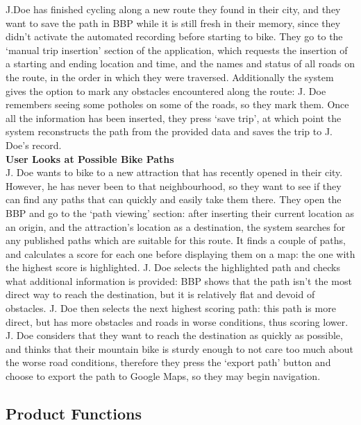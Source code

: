 J.Doe has finished cycling along a new route they found in their city, and they want to save the path 
in BBP while it is still fresh in their memory, since they didn’t activate the automated recording 
before starting to bike. They go to the ‘manual trip insertion’ section of the application, which 
requests the insertion of a starting and ending location and time, and the names and status of all 
roads on the route, in the order in which they were traversed. Additionally the system gives the 
option to mark any obstacles encountered along the route: J. Doe remembers seeing some potholes on 
some of the roads, so they mark them. Once all the information has been inserted, they press ‘save trip’, 
at which point the system reconstructs the path from the provided data and saves the trip to J. Doe’s 
record. \\
\newline
\textbf{User Looks at Possible Bike Paths}\\
J. Doe wants to bike to a new attraction that has recently opened in their city. However, he has never 
been to that neighbourhood, so they want to see if they can find any paths that can quickly and easily 
take them there. They open the BBP and go to the ‘path viewing’ section: after inserting their current 
location as an origin, and the attraction’s location as a destination, the system searches for any published 
paths which are suitable for this route. It finds a couple of paths, and calculates a score for each 
one before displaying them on a map: the one with the highest score is highlighted. J. Doe selects the 
highlighted path and checks what additional information is provided: BBP shows that the path isn’t the 
most direct way to reach the destination, but it is relatively flat and devoid of obstacles. J. Doe then 
selects the next highest scoring path: this path is more direct, but has more obstacles and roads in 
worse conditions, thus scoring lower. J. Doe considers that they want to reach the destination as quickly 
as possible, and thinks that their mountain bike is sturdy enough to not care too much about the worse 
road conditions, therefore they press the ‘export path’ button and choose to export the path to Google 
Maps, so they may begin navigation.

\subsection{Product Functions}

